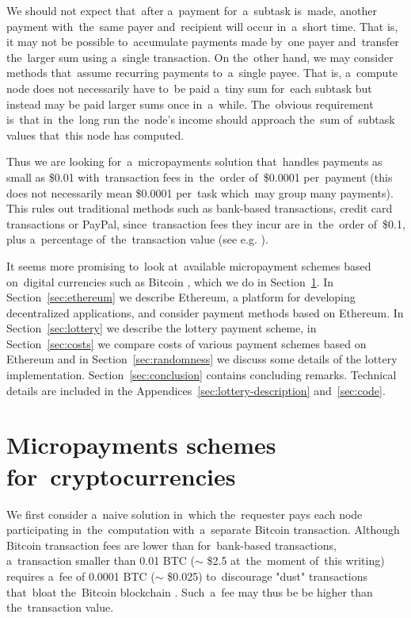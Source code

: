 \documentclass[a4paper]{article}
\newcommand{\BTC}{BTC}%
\begin{document}
    We should not expect that~after a~payment for~a~subtask  is~made, another payment with~the~same payer and~recipient
    will occur in~a~short time. That is, it may not be possible to~accumulate payments made by~one payer and~transfer
    the~larger sum using a~single transaction. On the~other hand, we may consider methods that~assume recurring
    payments to~a~single payee. That is, a~compute node does not necessarily have to~be paid a~tiny sum for~each
    subtask but instead may be paid larger sums once in~a~while. The~obvious requirement  is~that in~the~long run
    the~node's income should approach the~sum of~subtask values that~this node has computed.

    Thus we are looking for~a~micropayments solution that~handles payments as small as \$0.01 with~transaction fees
    in~the~order of~\$0.0001 per~payment (this does not necessarily mean \$0.0001 per~task which~may group many
    payments). This rules out traditional methods such as bank-based transactions, credit card transactions or PayPal,
    since~transaction fees they incur are in~the~order of~\$0.1, plus a~percentage of~the~transaction value
    (see e.g. \cite{FRS}).

    It seems more promising to~look at~available micropayment schemes based on~digital currencies such
    as Bitcoin \cite{BITCOIN}, which we do in Section~\ref{sec:cryptocurrencies}. In Section~\ref{sec:ethereum} we
    describe Ethereum, a platform for developing decentralized applications, and consider payment methods based
    on Ethereum. In Section~\ref{sec:lottery} we describe the lottery payment scheme, in Section~\ref{sec:costs} 
    we compare costs of various payment schemes based on Ethereum and in Section~\ref{sec:randomness} we discuss some
    details of the lottery implementation. Section~\ref{sec:conclusion} contains concluding remarks. Technical
    details are included in the Appendices~\ref{sec:lottery-description} and~\ref{sec:code}.

\section{Micropayments schemes for~cryptocurrencies}
\label{sec:cryptocurrencies}    

    We first consider a~naive solution in~which the~requester pays each node participating in~the~computation
    with~a~separate Bitcoin transaction. Although Bitcoin transaction fees are lower than for~bank-based transactions,
    a~transaction smaller than 0.01 \BTC{} ($\sim$ \$2.5 at~the~moment of~this writing) requires a~fee of
    0.0001 \BTC{} ($\sim$ \$0.025) to~discourage "dust" transactions that~bloat the~Bitcoin blockchain \cite{BITFEE}.
    Such~a~fee may thus be be higher than the~transaction value.
\end{document}
